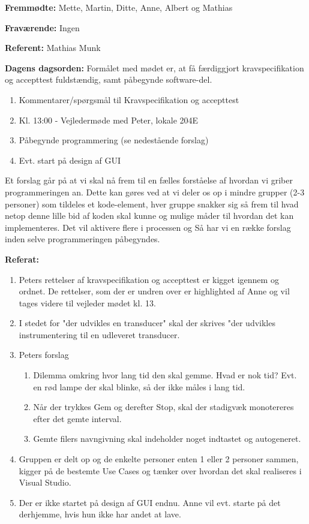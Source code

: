 \textbf{Fremmødte:} Mette, Martin, Ditte, Anne, Albert og Mathias 

\textbf{Fraværende:} Ingen

\textbf{Referent:} Mathias Munk

\textbf{Dagens dagsorden:}
\newline
Formålet med mødet er, at få færdiggjort kravspecifikation og accepttest fuldstændig, samt påbegynde software-del.
\begin{enumerate}
\item Kommentarer/spørgsmål til Kravspecifikation og accepttest

\item Kl. 13:00 - Vejledermøde med Peter, lokale 204E

\item Påbegynde programmering (se nedestående forslag)

\item Evt. start på design af GUI
\end{enumerate}

Et forslag går på at vi skal nå frem til en fælles forståelse af hvordan vi griber programmeringen an. Dette kan gøres ved at vi deler os op i mindre grupper (2-3 personer) som tildeles et kode-element, hver gruppe snakker sig så frem til hvad netop denne lille bid af koden skal kunne  og mulige måder til hvordan det kan implementeres. Det vil aktivere flere i processen og Så har vi en række forslag inden selve programmeringen påbegyndes.

\textbf{Referat:}
\begin{enumerate}
\item Peters rettelser af kravspecifikation og accepttest er kigget igennem og ordnet. De rettelser, som der er undren over er highlighted af Anne og vil tages videre til vejleder mødet kl. 13.
\item I stedet for "der udvikles en transducer" skal der skrives "der udvikles instrumentering til en udleveret transducer. 
\item Peters forslag
\begin{enumerate}
\item Dilemma omkring hvor lang tid den skal gemme. Hvad er nok tid? Evt. en rød lampe der skal blinke, så der ikke måles i lang tid.
\item Når der trykkes Gem og derefter Stop, skal der stadigvæk monotereres efter det gemte interval.
\item Gemte filers navngivning skal indeholder noget indtastet og autogeneret.
\end{enumerate}
\item Gruppen er delt op og de enkelte personer enten 1 eller 2 personer sammen, kigger på de bestemte Use Cases og tænker over hvordan det skal realiseres i Visual Studio. 
\item Der er ikke startet på design af GUI endnu. Anne vil evt. starte på det derhjemme, hvis hun ikke har andet at lave.
\end{enumerate}


